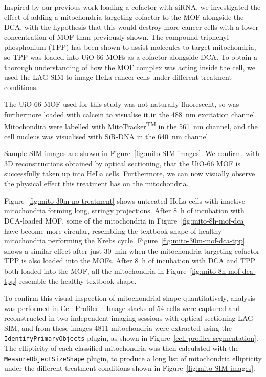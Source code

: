 Inspired by our previous work loading a cofactor with siRNA, we investigated the effect of adding a mitochondria-targeting cofactor to the MOF alongside the DCA, with the hypothesis that this would destroy more cancer cells with a lower concentration of MOF than previously shown. 
The compound triphenyl phosphonium (TPP) has been shown to assist molecules to target mitochondria, so TPP was loaded into UiO-66 MOFs as a cofactor alongside DCA. 
To obtain a thorough understanding of how the MOF complex was acting inside the cell, we used the LAG SIM to image HeLa cancer cells under different treatment conditions. 

The UiO-66 MOF used for this study was not naturally fluorescent, so was furthermore loaded with calcein to visualise it in the \SI{488}{\nano\metre} excitation channel. 
Mitochondira were labelled with MitoTracker\textsuperscript{TM} in the \SI{561}{\nano\metre} channel, and the cell nucleus was visualised with SiR-DNA in the \SI{640}{\nano\metre} channel. 

Sample SIM images are shown in Figure~\ref{fig:mito-SIM-images}. 
We confirm, with 3D reconstructions obtained by optical sectioning, that the UiO-66 MOF is successfully taken up into HeLa cells. %
Furthermore, we can now visually observe the physical effect this treatment has on the mitochondria. 

Figure~\ref{fig:mito-30m-no-treatment} shows untreated HeLa cells with inactive mitochondria forming long, stringy projections. 
After \SI{8}{\hour} of incubation with DCA-loaded MOF, some of the mitochondria in Figure~\ref{fig:mito-8h-mof-dca} have become more circular, resembling the textbook shape of healthy mitochondria performing the Krebs cycle.
Figure~\ref{fig:mito-30m-mof-dca-tpp} shows a similar effect after just \SI{30}{\minute} when the mitochondria-targeting cofactor TPP is also loaded into the MOFs. 
After \SI{8}{\hour} of incubation with DCA and TPP both loaded into the MOF, all the mitochondria in Figure~\ref{fig:mito-8h-mof-dca-tpp} resemble the healthy textbook shape. 

To confirm this visual inspection of mitochondrial shape quantitatively, analysis was performed in Cell Profiler~\cite{carpenter2006cellprofiler}.
Image stacks of 54 cells were captured and reconstructed in two independent imaging sessions with optical-sectioning LAG SIM, and from these images \num{4811} mitochondria were extracted using the \texttt{IdentifyPrimaryObjects} plugin, as shown in Figure~\ref{cell-profiler-segmentation}. 
The ellipticity of each classified mitochondria was then calculated with the \texttt{MeasureObjectSizeShape} plugin, to produce a long list of mitochondria ellipticity under the different treatment conditions shown in Figure~\ref{fig:mito-SIM-images}. 

